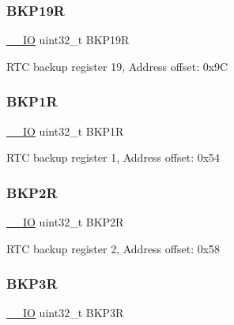 \subsubsection{\texorpdfstring{B\+K\+P19R}{BKP19R}}
{\footnotesize\ttfamily \mbox{\hyperlink{core__sc300_8h_aec43007d9998a0a0e01faede4133d6be}{\+\_\+\+\_\+\+IO}} uint32\+\_\+t B\+K\+P19R}

R\+TC backup register 19, Address offset\+: 0x9C \mbox{\label{struct_r_t_c___type_def_af85290529fb82acef7c9fcea3718346c}} 
\subsubsection{\texorpdfstring{B\+K\+P1R}{BKP1R}}
{\footnotesize\ttfamily \mbox{\hyperlink{core__sc300_8h_aec43007d9998a0a0e01faede4133d6be}{\+\_\+\+\_\+\+IO}} uint32\+\_\+t B\+K\+P1R}

R\+TC backup register 1, Address offset\+: 0x54 \mbox{\label{struct_r_t_c___type_def_aaa251a80daa57ad0bd7db75cb3b9cdec}} 
\subsubsection{\texorpdfstring{B\+K\+P2R}{BKP2R}}
{\footnotesize\ttfamily \mbox{\hyperlink{core__sc300_8h_aec43007d9998a0a0e01faede4133d6be}{\+\_\+\+\_\+\+IO}} uint32\+\_\+t B\+K\+P2R}

R\+TC backup register 2, Address offset\+: 0x58 \mbox{\label{struct_r_t_c___type_def_a0b1eeda834c3cfd4d2c67f242f7b2a1c}} 
\subsubsection{\texorpdfstring{B\+K\+P3R}{BKP3R}}
{\footnotesize\ttfamily \mbox{\hyperlink{core__sc300_8h_aec43007d9998a0a0e01faede4133d6be}{\+\_\+\+\_\+\+IO}} uint32\+\_\+t B\+K\+P3R}

